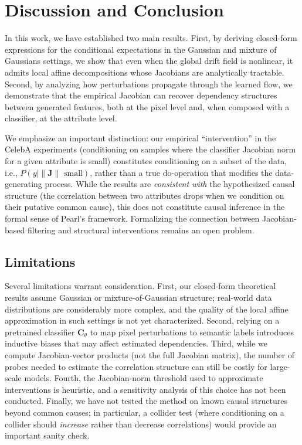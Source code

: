 \section{Discussion and Conclusion}
\label{sec:discussion_conclusion}
In this work, we have established two main results. First, by deriving closed-form expressions for the conditional expectations in the Gaussian and mixture of Gaussians settings, we show that even when the global drift field is nonlinear, it admits local affine decompositions whose Jacobians are analytically tractable. Second, by analyzing how perturbations propagate through the learned flow, we demonstrate that the empirical Jacobian can recover dependency structures between generated features, both at the pixel level and, when composed with a classifier, at the attribute level.

We emphasize an important distinction: our empirical ``intervention'' in the CelebA experiments (conditioning on samples where the classifier Jacobian norm for a given attribute is small) constitutes conditioning on a subset of the data, i.e., $P(y \mid \|\mathbf{J}\| \text{ small})$, rather than a true $\mathrm{do}$-operation that modifies the data-generating process. While the results are \emph{consistent with} the hypothesized causal structure (the correlation between two attributes drops when we condition on their putative common cause), this does not constitute causal inference in the formal sense of Pearl's framework. Formalizing the connection between Jacobian-based filtering and structural interventions remains an open problem.

\subsection{Limitations}
Several limitations warrant consideration. First, our closed-form theoretical results assume Gaussian or mixture-of-Gaussian structure; real-world data distributions are considerably more complex, and the quality of the local affine approximation in such settings is not yet characterized. Second, relying on a pretrained classifier $\mathbf{C}_\theta$ to map pixel perturbations to semantic labels introduces inductive biases that may affect estimated dependencies. Third, while we compute Jacobian-vector products (not the full Jacobian matrix), the number of probes needed to estimate the correlation structure can still be costly for large-scale models. Fourth, the Jacobian-norm threshold used to approximate interventions is heuristic, and a sensitivity analysis of this choice has not been conducted. Finally, we have not tested the method on known causal structures beyond common causes; in particular, a collider test (where conditioning on a collider should \emph{increase} rather than decrease correlations) would provide an important sanity check.

